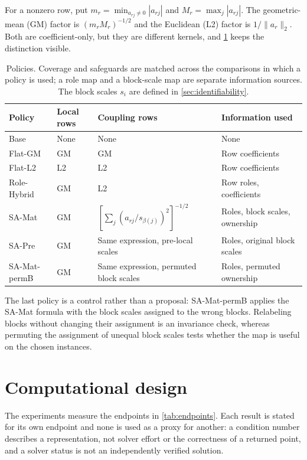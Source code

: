 \documentclass[smallextended,envcountsect,envcountsame]{svjour3}
\begin{document}
For a nonzero row, put $m_r=\min_{a_{rj}\ne0}|a_{rj}|$ and $M_r=\max_j|a_{rj}|$. The
geometric-mean (GM) factor is $(m_rM_r)^{-1/2}$ and the Euclidean (L2) factor is
$1/\|a_r\|_2$. Both are coefficient-only, but they are different kernels, and
\cref{tab:policies} keeps the distinction visible.
\begin{table}[tb]
\centering\small
\caption{Policies. Coverage and safeguards are matched across the comparisons in which a policy
is used; a role map and a block-scale map are separate information sources. The block scales
$s_i$ are defined in \cref{sec:identifiability}.}\label{tab:policies}
\begin{tabularx}{\linewidth}{llX>{\raggedright\arraybackslash}X}
\toprule
Policy & Local rows & Coupling rows & Information used\\
\midrule
Base & None & None & None\\
Flat-GM & GM & GM & Row coefficients\\
Flat-L2 & L2 & L2 & Row coefficients\\
Role-Hybrid & GM & L2 & Row roles, coefficients\\
SA-Mat & GM & $\left[\sum_j(a_{rj}/s_{\beta(j)})^2\right]^{-1/2}$ & Roles, block scales, ownership\\
SA-Pre & GM & Same expression, pre-local scales & Roles, original block scales\\
SA-Mat-permB & GM & Same expression, permuted block scales & Roles, permuted ownership\\
\bottomrule
\end{tabularx}
\end{table}

The last policy is a control rather than a proposal: SA-Mat-permB applies the SA-Mat formula
with the block scales assigned to the wrong blocks. Relabeling blocks without changing their
assignment is an invariance check, whereas permuting the assignment of unequal block scales
tests whether the map is useful on the chosen instances.




\section{Computational design}
\label{sec:experiments}
The experiments measure the endpoints in \cref{tab:endpoints}. Each result is stated for its
own endpoint and none is used as a proxy for another: a condition number describes a
representation, not solver effort or the correctness of a returned point, and a solver status is
not an independently verified solution.
\end{document}
